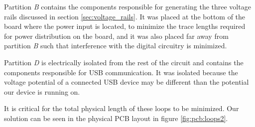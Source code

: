     Partition \emph{B} contains the  components responsible for generating the
    three voltage  rails discussed in section  \ref{sec:voltage_rails}. It was
    placed at  the bottom of  the board where the  power input is  located, to
    minimize the trace  lengths required for power distribution  on the board,
    and  it  was also  placed  far  away  from  partition \emph{B}  such  that
    interference with the digital circuitry is minimized.

    Partition \emph{D} is  electrically isolated from the rest  of the circuit
    and contains  the components  responsible for  USB communication.   It was
    isolated because  the voltage potential of  a connected USB device  may be
    different than the potential our device is running on.

    It  is  critical for  the  total  physical length  of  these  loops to  be
    minimized. Our solution can  be seen in the physical PCB  layout in figure
    \ref{fig:pcb:loops2}.


